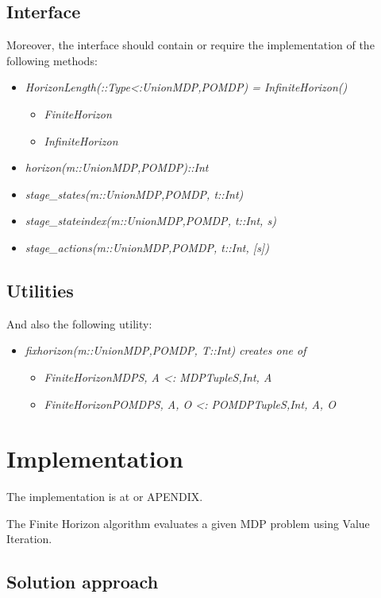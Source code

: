 \subsection{Interface}
Moreover, the interface should contain or require the implementation of the following methods:
\begin{itemize}
    \item \textit{HorizonLength(::Type{<:Union{MDP,POMDP}}) = InfiniteHorizon()}
    \begin{itemize}
        \item \textit{FiniteHorizon}
        \item \textit{InfiniteHorizon}
    \end{itemize}
    \item \textit{horizon(m::Union{MDP,POMDP})::Int}
    \item \textit{stage\_states(m::Union{MDP,POMDP}, t::Int)}
    \item \textit{stage\_stateindex(m::Union{MDP,POMDP}, t::Int, s)}
    \item \textit{stage\_actions(m::Union{MDP,POMDP}, t::Int, [s])}
\end{itemize}

\subsection{Utilities}
And also the following utility:

\begin{itemize}
    \item \textit{fixhorizon(m::Union{MDP,POMDP}, T::Int) creates one of}
    \begin{itemize}
        \item \textit{FiniteHorizonMDP{S, A} <: MDP{Tuple{S,Int}, A}}
        \item \textit{FiniteHorizonPOMDP{S, A, O} <: POMDP{Tuple{S,Int}, A, O}}
    \end{itemize}
\end{itemize}

\section{Implementation}

The implementation is at \cite{FHPOMDP} or APENDIX.

The Finite Horizon algorithm evaluates a given MDP problem using Value Iteration.  

\subsection{Solution approach}

